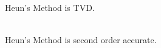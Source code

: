 \begin{propertybox}\nospacing
    \begin{property}\label{property:title}
        Heun's Method is TVD.
    \end{property}
\end{propertybox}
\begin{propertybox}\nospacing
    \begin{property}\label{property:title}\leavevmode\\
        Heun's Method is second order accurate.
    \end{property}
\end{propertybox}
